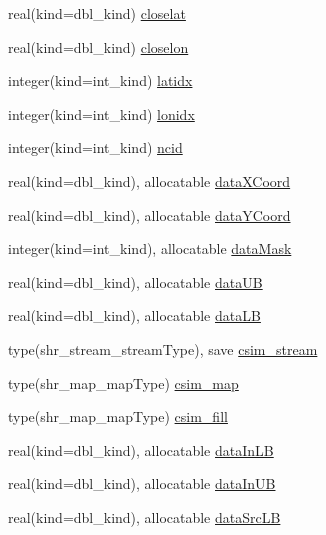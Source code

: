 \begin{DoxyCompactItemize}
real(kind=dbl\_\-kind) \hyperlink{namespaceice__prescribed__mod_ab6b945488fb9a21b8c0abf9c5c9f13d3}{closelat}
\item 
real(kind=dbl\_\-kind) \hyperlink{namespaceice__prescribed__mod_a0a932ccb360a743d8d05b685438cce6f}{closelon}
\item 
integer(kind=int\_\-kind) \hyperlink{namespaceice__prescribed__mod_a406e46eaa55988c516d70a9e9ed1fb2a}{latidx}
\item 
integer(kind=int\_\-kind) \hyperlink{namespaceice__prescribed__mod_a21240c657fdbc312b6cdd4c31395ede0}{lonidx}
\item 
integer(kind=int\_\-kind) \hyperlink{namespaceice__prescribed__mod_a2f99c0b35d65529144252c26d4762bc7}{ncid}
\item 
real(kind=dbl\_\-kind), allocatable \hyperlink{namespaceice__prescribed__mod_a05759838d18f2fbc703a6ff43bdc217b}{dataXCoord}
\item 
real(kind=dbl\_\-kind), allocatable \hyperlink{namespaceice__prescribed__mod_abf3b4ab489983d1531847794139e9397}{dataYCoord}
\item 
integer(kind=int\_\-kind), allocatable \hyperlink{namespaceice__prescribed__mod_a4d4897310d6673a94b06d49fd6adfbcc}{dataMask}
\item 
real(kind=dbl\_\-kind), allocatable \hyperlink{namespaceice__prescribed__mod_a6cbaf1dd947b14ebfe7fee398952dd6b}{dataUB}
\item 
real(kind=dbl\_\-kind), allocatable \hyperlink{namespaceice__prescribed__mod_a74430be62d3958af3edd6b7254027d08}{dataLB}
\item 
type(shr\_\-stream\_\-streamType), save \hyperlink{namespaceice__prescribed__mod_ae8eb8307f8c4017094a64d99000f458d}{csim\_\-stream}
\item 
type(shr\_\-map\_\-mapType) \hyperlink{namespaceice__prescribed__mod_ada89f7f5c26e2923f8fab5f837979bd9}{csim\_\-map}
\item 
type(shr\_\-map\_\-mapType) \hyperlink{namespaceice__prescribed__mod_a9cc059c1adaefc7ef43aa8ccf9f774ea}{csim\_\-fill}
\item 
real(kind=dbl\_\-kind), allocatable \hyperlink{namespaceice__prescribed__mod_a7b605d560be8c1903b0df4b66076f31a}{dataInLB}
\item 
real(kind=dbl\_\-kind), allocatable \hyperlink{namespaceice__prescribed__mod_a07649c4c91bccc292f9aa60851ab2a14}{dataInUB}
\item 
real(kind=dbl\_\-kind), allocatable \hyperlink{namespaceice__prescribed__mod_a14513a8e50e8321ddac9e3f9d091cd12}{dataSrcLB}
\item 

\end{DoxyCompactItemize}
